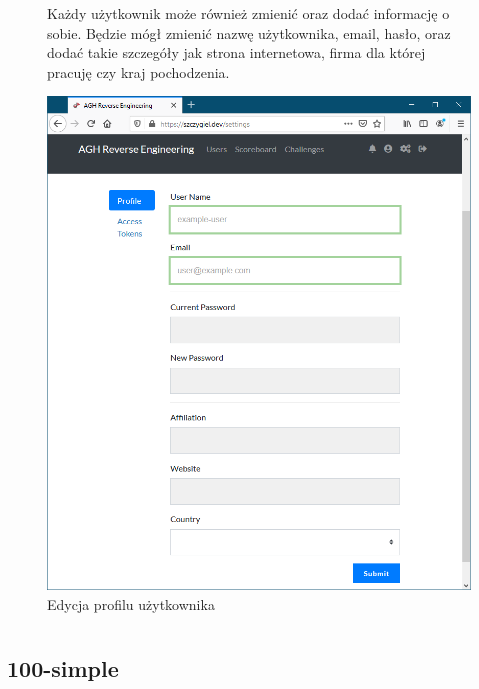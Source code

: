 \documentclass[polish,12pt]{aghthesis}
\begin{document}
\begin{figure}[ht]
    Każdy użytkownik może również zmienić oraz dodać informację o sobie.
    Będzie mógł zmienić nazwę użytkownika, email, hasło, oraz dodać
    takie szczegóły jak strona internetowa, firma dla której pracuję czy kraj pochodzenia.

    \vspace{1cm}

    \centering
    \includegraphics[width=14cm]{szczygiel_dev_settings}
    \caption{Edycja profilu użytkownika}
    \label{fig:szczygiel_dev_settings}
\end{figure}

\clearpage

\section{\SectionTitleRealizationAspects}
\label{sec:wybrane-aspekty-realizacji}

\subsection{100-simple}
\end{document}
